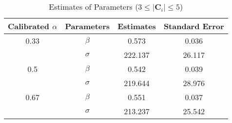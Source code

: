 \begin{table}[H]
    \centering
    \caption{Estimates of Parameters ($3 \leq |\mathbf{C}_i| \leq 5$)}
    \label{table: estimates (min_size=3 max_size=5 margin=3000)}
    \begin{tabular}{cccc}
        \toprule
        Calibrated $\alpha$ & Parameters & Estimates & Standard Error \\
        \midrule
        0.33                & $\beta$    & 0.573     & 0.036          \\
                            & $\sigma$   & 222.137   & 26.117         \\
        \midrule
        0.5                 & $\beta$    & 0.542     & 0.039          \\
                            & $\sigma$   & 219.644   & 28.976         \\
        \midrule
        0.67                & $\beta$    & 0.551     & 0.037          \\
                            & $\sigma$   & 213.237   & 25.542         \\
        \bottomrule
    \end{tabular}
\end{table}

